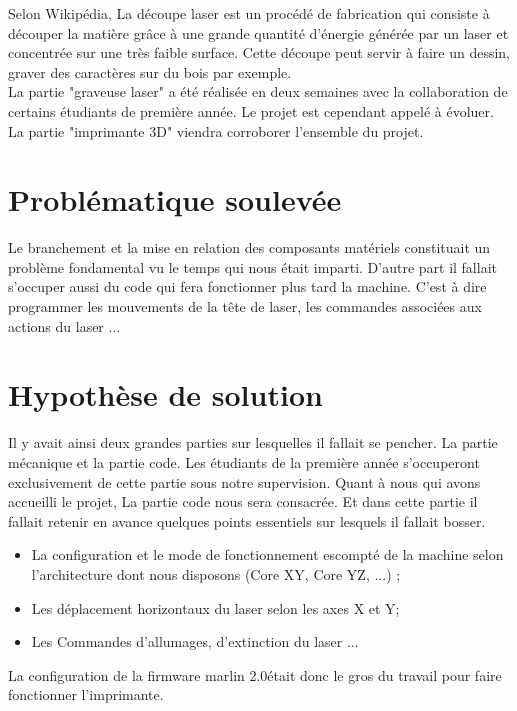Selon Wikipédia, La découpe laser est un procédé de fabrication qui consiste à découper la matière grâce à une grande quantité d’énergie générée par un laser et concentrée sur une très faible surface. Cette découpe peut servir à faire un dessin, graver des caractères sur du bois par exemple. \\

La partie "graveuse laser" a été réalisée en deux semaines avec la collaboration de certains étudiants de première année. Le projet est cependant appelé à évoluer. La partie "imprimante 3D" viendra corroborer l'ensemble du projet.

\section{Problématique soulevée}
Le branchement et la mise en relation des composants matériels constituait un problème fondamental vu le temps qui nous était imparti. D'autre part il fallait s'occuper aussi du code qui fera fonctionner plus tard la machine. C'est à dire programmer les mouvements de la tête de laser, les commandes associées aux actions du laser ...

\section{Hypothèse de solution}

Il y avait ainsi deux grandes parties sur lesquelles il fallait se pencher. La partie mécanique et la partie code. Les étudiants de la première année s'occuperont exclusivement de cette partie sous notre supervision. Quant à nous qui avons accueilli le projet, La partie code nous sera consacrée. Et dans cette partie il fallait retenir en avance quelques points essentiels sur lesquels il fallait bosser.

\begin{itemize}
\item La configuration et le mode de fonctionnement escompté de la machine selon l'architecture dont nous disposons  (Core XY, Core YZ, ...) ;
\item Les déplacement horizontaux du laser selon les axes X et Y;
\item Les Commandes d'allumages, d'extinction du laser ...
\end{itemize}

La configuration de la firmware marlin 2.0\footnotemark était donc le gros du travail pour faire fonctionner l'imprimante.

